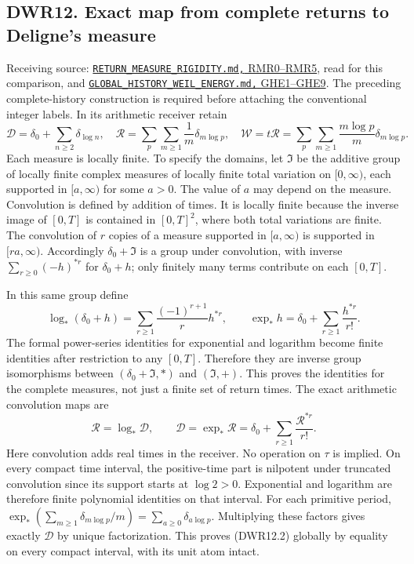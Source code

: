 \subsection{DWR12. Exact map from complete returns to Deligne's
measure}\label{dwr12.-exact-map-from-complete-returns-to-delignes-measure}

Receiving source:
\href{RETURN_MEASURE_RIGIDITY.md}{\nolinkurl{RETURN_MEASURE_RIGIDITY.md,}
RMR0--RMR5}, read for this comparison, and
\href{GLOBAL_HISTORY_WEIL_ENERGY.md}{\nolinkurl{GLOBAL_HISTORY_WEIL_ENERGY.md,}
GHE1--GHE9}. The preceding complete-history construction is required
before attaching the conventional integer labels. In its arithmetic
receiver retain \[
\mathcal D=\delta_0+\sum_{n\ge2}\delta_{\log n},\quad
\mathcal R=\sum_p\sum_{m\ge1}\frac1m\delta_{m\log p},\quad
\mathcal W=t\mathcal R=\sum_p\sum_{m\ge1}\frac{m\log p}{m}\delta_{m\log p}.
\tag{DWR12.1}
\] Each measure is locally finite. To specify the domains, let
\(\mathfrak I\) be the additive group of locally finite complex measures
of locally finite total variation on \([0,\infty)\), each supported in
\([a,\infty)\) for some \(a>0\). The value of \(a\) may depend on the
measure. Convolution is defined by addition of times. It is locally
finite because the inverse image of \([0,T]\) is contained in
\([0,T]^2\), where both total variations are finite. The convolution of
\(r\) copies of a measure supported in \([a,\infty)\) is supported in
\([ra,\infty)\). Accordingly \(\delta_0+\mathfrak I\) is a group under
convolution, with inverse \(\sum_{r\ge0}(-h)^{*r}\) for \(\delta_0+h\);
only finitely many terms contribute on each \([0,T]\).

In this same group define \[
\log_*(\delta_0+h)=\sum_{r\ge1}\frac{(-1)^{r+1}}r h^{*r},
\qquad
\exp_*h=\delta_0+\sum_{r\ge1}\frac{h^{*r}}{r!}.
\tag{DWR12.1a}
\] The formal power-series identities for exponential and logarithm
become finite identities after restriction to any \([0,T]\). Therefore
they are inverse group isomorphisms between \((\delta_0+\mathfrak I,*)\)
and \((\mathfrak I,+)\). This proves the identities for the complete
measures, not just a finite set of return times. The exact arithmetic
convolution maps are \[
\mathcal R=\log_*\mathcal D,\qquad
\mathcal D=\exp_*\mathcal R
=\delta_0+\sum_{r\ge1}\frac{\mathcal R^{*r}}{r!}.
\tag{DWR12.2}
\] Here convolution adds real times in the receiver. No operation on
\(\tau\) is implied. On every compact time interval, the positive-time
part is nilpotent under truncated convolution since its support starts
at \(\log2>0\). Exponential and logarithm are therefore finite
polynomial identities on that interval. For each primitive period,
\(\exp_*(\sum_{m\ge1}\delta_{m\log p}/m)=\sum_{a\ge0}\delta_{a\log p}\).
Multiplying these factors gives exactly \(\mathcal D\) by unique
factorization. This proves (DWR12.2) globally by equality on every
compact interval, with its unit atom intact.

